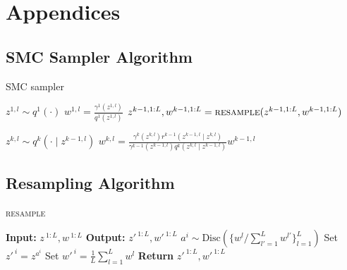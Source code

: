 \documentclass[anonymous=false, %
               format=acmsmall, %
               review=true, %
               screen=true, %
               nonacm=true]{acmart}
\theoremstyle{definition}
\begin{document}




\newpage
\section{Appendices}
\subsection{SMC Sampler Algorithm}
\label{appendix:smc-alg}
\begin{algorithm}[!h]
  \caption{SMC sampler}
  \label{alg:smcs}
\begin{algorithmic}[1]
    \small
        \State $z^{1,l} \sim q^1(\cdot)$
        \State $w^{1,l} = \frac{\gamma^1(z^{1,l})}{q^1(z^{1,l})}$
    \EndFor
      \State$z^{k-1,1:L}, w^{k-1,1:L}=\textsc{resample}(z^{k-1,1:L}, w^{k-1,1:L})$

          \State $z^{k,l} \sim q^k(\cdot \mid z^{k-1,l})$\label{line:apg-propose}
          \State $w^{k,l} = \frac{\gamma^k(z^{k,l}) r^{k-1}(z^{k-1,l} \mid z^{k,l})}{\gamma^{k-1}(z^{k-1,l}) q^k(z^{k,l} \mid z^{k-1,l})}w^{k-1,l}$
      \EndFor
    \EndFor
\end{algorithmic}
\end{algorithm}

\subsection{Resampling Algorithm}
\label{appendix:resample-alg}
\begin{algorithm}[!h]
  \caption{\textsc{resample}}
  \label{alg:resample}
\begin{algorithmic}[1]
\small
  \State \textbf{Input:} $z^{\:1:L}, w^{\:1:L}$
  \State \textbf{Output:} $z'^{\:1:L}, w'^{\:1:L}$
    \State $a^i \sim \mathrm{Disc}(\{w^l / \sum_{l' = 1}^L w^{l'}\}_{l=1}^L)$ 
    \State Set $ z'^{\:i} = z^{a^i}$
    \State Set $ w'^{\:i} = \frac{1}{L} \sum_{l = 1}^L w^l$
    \EndFor
  \State \textbf{Return} $z'^{\:1:L}, w'^{\:1:L}$
\end{algorithmic}
\end{algorithm}
\end{document}

